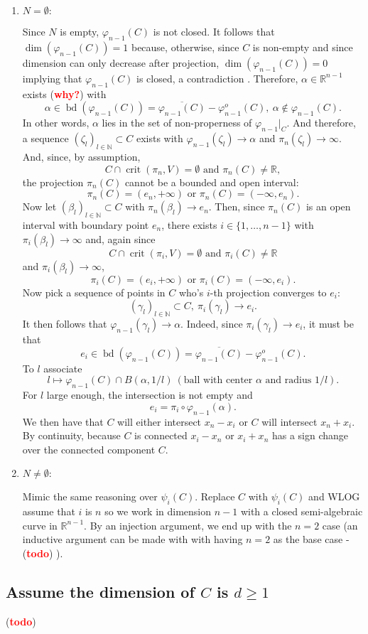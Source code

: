 \documentclass[11pt]{article}
\theoremstyle{definition}
\newcommand{\N}{\mathbb{N}}
\newcommand{\R}{\mathbb{R}}
\newcommand{\vp}{\varphi}
\def\td{(\textcolor{red}{{\bf todo}})}
\def\td{(\textcolor{red}{{\bf todo}}) }
\def\why{(\textcolor{red}{{\bf why?}}) }
\DeclareMathOperator{\bd}{bd}
\DeclareMathOperator{\crit}{crit}
\begin{document}
\begin{enumerate}
    \item $N = \emptyset:$ 
    \par 
    Since $N$ is empty, $\vp_{n-1}(C)$ is not closed. It follows that $\dim(\vp_{n-1}(C))=1$ because, otherwise, since $C$ is non-empty  and since dimension can only decrease after projection, $\dim(\vp_{n-1}(C))=0$ implying that $\vp_{n-1}(C)$ is closed, a contradiction \lightning. Therefore, $\alpha \in \R^{n-1}$ exists \why with 
    \[
    \alpha \in \bd(\vp_{n-1}(C)) = \overline{\vp_{n-1}(C)} - \vp_{n-1}^o(C),~ \alpha \not \in \vp_{n-1}(C).
    \]
    In other words, $\alpha$ lies in the set of non-properness of $\vp_{n-1}|_C$. And therefore, a sequence $(\zeta_l)_{l \in \N} \subset C$ exists with $\vp_{n-1}(\zeta_l) \rightarrow \alpha$ and $\pi_n(\zeta_l) \rightarrow \infty.$ And, since, by assumption, 
\[
    C \cap \crit(\pi_n,V) = \emptyset \textrm{ and  } \pi_n(C) \not = \R,
\]
the projection $\pi_n(C)$ cannot be a bounded and open interval:
\[
\pi_n(C) = (e_n,+\infty) \textrm{ or } \pi_n(C) = (-\infty,e_n). 
\]
Now let $(\beta_l)_{l \in \N} \subset C$ with $\pi_n(\beta_l) \rightarrow e_n$. Then, since $\pi_n(C)$ is an open interval with boundary point $e_n$, there exists $i \in \{1,\hdots,n-1\}$ with $\pi_i(\beta_l) \rightarrow \infty$ and, again since \[
    C \cap \crit(\pi_i,V) = \emptyset \textrm{ and  } \pi_i(C) \not = \R
\]
and $\pi_i(\beta_l) \rightarrow \infty$,
\[
\pi_i(C) = (e_i,+\infty) \textrm{ or } \pi_i(C) = (-\infty,e_i). 
\]
Now pick a sequence of points in $C$ who's $i$-th projection converges to $e_i:$ 
\[
(\gamma_l)_{l \in \N} \subset C,~ \pi_i(\gamma_l) \rightarrow e_i.
\]
It then follows that $\vp_{n-1}(\gamma_l) \rightarrow \alpha$. Indeed, since $\pi_i(\gamma_l) \rightarrow e_i$, it must be that 
\[
e_i \in \bd(\vp_{n-1}(C)) = \overline{\vp_{n-1}(C)} - \vp_{n-1}^o(C).
\]
To $l$ associate 
\[
l \mapsto \vp_{n-1}(C) \cap B(\alpha,1/l)~(\textrm{ball with center }\alpha \textrm{ and radius } 1/l).
\]
For $l$ large enough, the intersection is not empty and
\[
e_i =\pi_i\circ \vp_{n-1}(\alpha).
\]
We then have that $C$ will either intersect $x_n-x_i$ or $C$ will intersect $x_n+x_i$. By continuity, because $C$ is connected $x_i - x_n$ or $x_i+x_n$ has a sign change over the connected component $C$. 
%
\item $N \not = \emptyset:$
\par 
Mimic the same reasoning over $\psi_i(C)$. Replace $C$ with $\psi_i(C)$ and WLOG assume that $i$ is $n$ so we work in dimension $n-1$ with a closed semi-algebraic curve in $\R^{n-1}$. By an injection argument, we end up with the $n=2$ case (an inductive argument can be made with with having $n=2$ as the base case - \td).  
\end{enumerate}



\subsection*{Assume the dimension of $C$ is $d\geq 1$}
\td 
\end{document}
